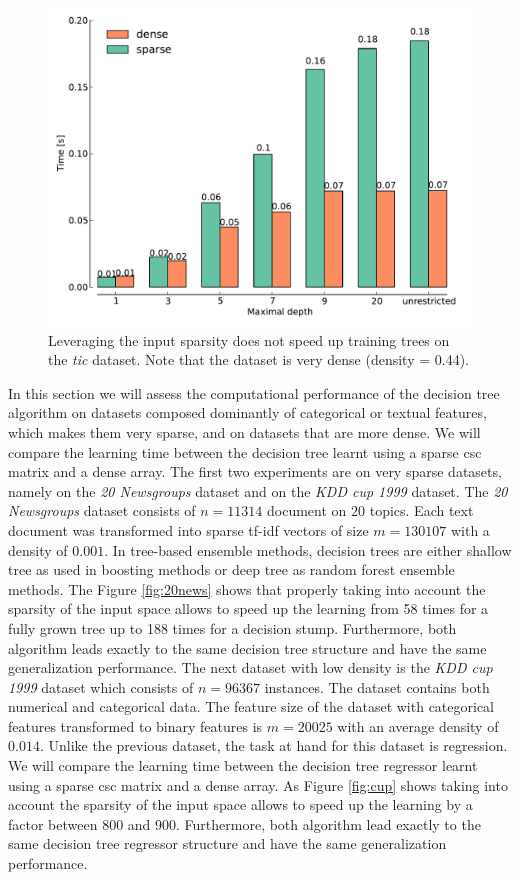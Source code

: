 \begin{figure}[h]
\centering
\includegraphics[scale=0.45]{images/tic.pdf}
\caption{Leveraging the input sparsity does not speed up training trees on the \emph{tic}
         dataset. Note that the dataset is very dense (density = 0.44).}
\label{fig:tic}
\end{figure}

In this section we will assess the computational performance of the decision tree algorithm on datasets composed dominantly of categorical or textual features, which makes them very sparse, and on datasets that are more dense. We will compare the learning time between the decision tree learnt
using a sparse csc matrix and a dense array.
The first two experiments are on very sparse datasets, namely on the \emph{20 Newsgroups} dataset \cite{joachims1996probabilistic} and on the \emph{KDD cup 1999} dataset\cite{bay2000archive}. The \emph{20 Newsgroups} dataset
consists of $n=11314$ document on $20$ topics. Each text document was
transformed into sparse tf-idf vectors of size $m=130107$ with a density of
$0.001$. 
In tree-based ensemble methods, decision trees are either shallow tree as used
in boosting methods or deep tree as random forest ensemble methods. The Figure
\ref{fig:20news} shows that properly taking into account the sparsity of the
input space allows to speed up the learning from 58 times for a fully grown
tree up to 188 times for a decision stump. Furthermore, both algorithm leads
exactly to the same decision tree structure and have the same generalization
performance. The next dataset with low density is the \emph{KDD cup 1999} dataset which consists of $n=96367$ instances. The dataset contains both numerical and categorical data. The feature size of the dataset with categorical features transformed to binary features is $m=20025$ with an average density of
$0.014$. Unlike the previous dataset, the task at hand for this dataset is regression. We will compare the learning time between the decision tree regressor learnt
using a sparse csc matrix and a dense array. As Figure \ref{fig:cup} shows taking into account the sparsity of the
input space allows to speed up the learning by a factor between 800 and 900. Furthermore, both algorithm lead
exactly to the same decision tree regressor structure and have the same generalization
performance.


